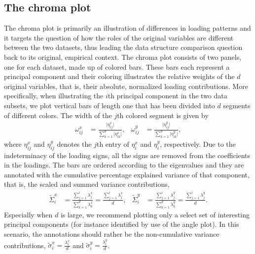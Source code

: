 \documentclass[a4paper,12pt]{article}
\begin{document}
\subsection*{The chroma plot}
The chroma plot is primarily an illustration of differences in loading patterns and it targets the question of how the roles of the original variables are different between the two datasets, thus leading the data structure comparison question back to its original, empirical context. The chroma plot consists of two panels, one for each dataset, made up of colored bars. These bars each represent a principal component and their coloring illustrates the relative weights of the $d$ original variables, that is, their absolute, normalized loading contributions. More specifically, when illustrating the $i$th principal component in the two data subsets, we plot vertical bars of length one that has been divided into $d$ segments of different colors. The width of the $j$th colored segment is given by
\begin{align*}
\omega_{ij}^x &= \frac{\lvert\eta_{ij}^x \rvert}{\sum_{k=1}^d \lvert\eta_{ik}^x\rvert}, &
\omega_{ij}^y &= \frac{\lvert\eta_{ij}^y\rvert}{\sum_{k=1}^d \lvert\eta_{ik}^y\rvert},
\end{align*}
where $\eta_{ij}^x$ and $\eta_{ij}^y$ denotes the $j$th entry of $\eta_{i}^x$ and $\eta_{i}^y$, respectively. Due to the indeterminacy of the loading signs, all the signs are removed from the coefficients in the loadings. The bars are ordered according to the eigenvalues and they are annotated with the cumulative percentage explained variance of that component, that is, the scaled and summed variance contributions,
\begin{align*}
\tilde\Sigma^x_{i} &= \frac{\sum_{j=1}^i \lambda_{j}^x}{\sum_{k=1}^d \lambda_{k}^x} = \frac{\sum_{j=1}^i \lambda_{j}^x}{d}, &
\tilde\Sigma^y_{i} &= \frac{\sum_{j=1}^i \lambda_{j}^y}{\sum_{k=1}^d \lambda_{k}^y} = \frac{\sum_{j=1}^i \lambda_{j}^y}{d}.
\end{align*}
Especially when $d$ is large, we recommend plotting only a select set of interesting principal components (for instance identified by use of the angle plot). In this scenario, the annotations should rather be the non-cumulative variance contributions, $\tilde\sigma_{i}^x = \frac{\lambda_{i}^x}{d}$ and $\tilde\sigma_{i}^y = \frac{\lambda_{i}^y}{d}$.

\end{document}
